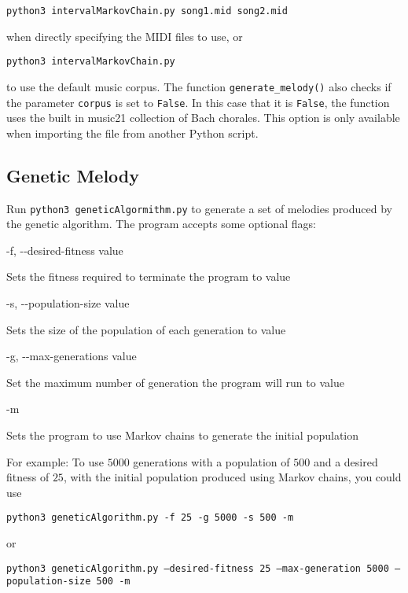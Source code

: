 \texttt{python3 intervalMarkovChain.py song1.mid song2.mid}

\noindent when directly specifying the MIDI files to use, or

\texttt{python3 intervalMarkovChain.py}

\noindent to use the default music corpus.
The function \texttt{generate\_melody()} also checks if the parameter \texttt{corpus} is set to \texttt{False}.
In this case that it is \texttt{False}, the function uses the built in music21 collection of Bach chorales.
This option is only available when importing the file from another Python script.


\subsection{Genetic Melody} \label{software:howtouse:ga}

Run \texttt{python3 geneticAlgormithm.py} to generate a set of melodies produced by the genetic algorithm.
The program accepts some optional flags:

\noindent -f, -{}-desired-fitness value 

Sets the fitness required to terminate the program to value

\noindent -s, -{}-population-size value

Sets the size of the population of each generation to value

\noindent -g, -{}-max-generations value

Set the maximum number of generation the program will run to value

\noindent -m

Sets the program to use Markov chains to generate the initial population

For example: To use $5000$ generations with a population of $500$ and a desired fitness of $25$, with the initial population produced using Markov chains, you could use

\texttt{python3 geneticAlgorithm.py -f 25 -g 5000 -s 500 -m}

\noindent or

\texttt{python3 geneticAlgorithm.py --desired-fitness 25 --max-generation 5000 --population-size 500 -m}
